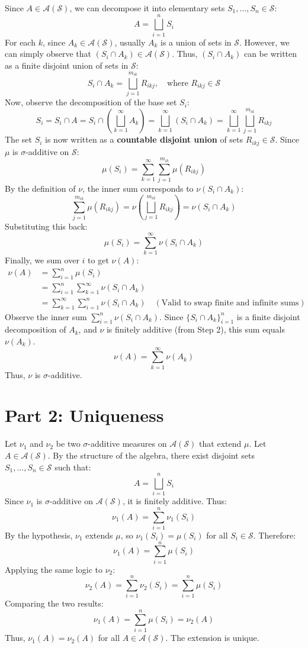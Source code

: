\documentclass[12pt, a4paper]{article}
\theoremstyle{definition}
\newcommand{\Sem}{\mathcal{S}} %
\newcommand{\Alg}{\mathcal{A}(\mathcal{S})} %
\newcommand{\DisjointUnion}{\bigsqcup}
\begin{document}
Since $A \in \Alg$, we can decompose it into elementary sets $S_1, \dots, S_n \in \Sem$:
\[
A = \DisjointUnion_{i=1}^n S_i
\]
For each $k$, since $A_k \in \Alg$, usually $A_k$ is a union of sets in $\Sem$. However, we can simply observe that $(S_i \cap A_k) \in \Alg$. Thus, $(S_i \cap A_k)$ can be written as a finite disjoint union of sets in $\Sem$:
\[
S_i \cap A_k = \DisjointUnion_{j=1}^{m_{ik}} R_{ikj}, \quad \text{where } R_{ikj} \in \Sem
\]
Now, observe the decomposition of the base set $S_i$:
\[
S_i = S_i \cap A = S_i \cap \left( \DisjointUnion_{k=1}^\infty A_k \right) = \DisjointUnion_{k=1}^\infty (S_i \cap A_k) = \DisjointUnion_{k=1}^\infty \DisjointUnion_{j=1}^{m_{ik}} R_{ikj}
\]
The set $S_i$ is now written as a \textbf{countable disjoint union} of sets $R_{ikj} \in \Sem$. Since $\mu$ is $\sigma$-additive on $\Sem$:
\[
\mu(S_i) = \sum_{k=1}^\infty \sum_{j=1}^{m_{ik}} \mu(R_{ikj})
\]
By the definition of $\nu$, the inner sum corresponds to $\nu(S_i \cap A_k)$:
\[
\sum_{j=1}^{m_{ik}} \mu(R_{ikj}) = \nu\left( \DisjointUnion_{j=1}^{m_{ik}} R_{ikj} \right) = \nu(S_i \cap A_k)
\]
Substituting this back:
\[
\mu(S_i) = \sum_{k=1}^\infty \nu(S_i \cap A_k)
\]
Finally, we sum over $i$ to get $\nu(A)$:
\begin{align*}
    \nu(A) &= \sum_{i=1}^n \mu(S_i) \\
           &= \sum_{i=1}^n \sum_{k=1}^\infty \nu(S_i \cap A_k) \\
           &= \sum_{k=1}^\infty \sum_{i=1}^n \nu(S_i \cap A_k) \quad (\text{Valid to swap finite and infinite sums})
\end{align*}
Observe the inner sum $\sum_{i=1}^n \nu(S_i \cap A_k)$. Since $\{S_i \cap A_k\}_{i=1}^n$ is a finite disjoint decomposition of $A_k$, and $\nu$ is finitely additive (from Step 2), this sum equals $\nu(A_k)$.
\[
\nu(A) = \sum_{k=1}^\infty \nu(A_k)
\]
Thus, $\nu$ is $\sigma$-additive.

\section{Part 2: Uniqueness}

Let $\nu_1$ and $\nu_2$ be two $\sigma$-additive measures on $\Alg$ that extend $\mu$.
Let $A \in \Alg$. By the structure of the algebra, there exist disjoint sets $S_1, \dots, S_n \in \Sem$ such that:
\[
A = \DisjointUnion_{i=1}^n S_i
\]
Since $\nu_1$ is $\sigma$-additive on $\Alg$, it is finitely additive. Thus:
\[
\nu_1(A) = \sum_{i=1}^n \nu_1(S_i)
\]
By the hypothesis, $\nu_1$ extends $\mu$, so $\nu_1(S_i) = \mu(S_i)$ for all $S_i \in \Sem$. Therefore:
\[
\nu_1(A) = \sum_{i=1}^n \mu(S_i)
\]
Applying the same logic to $\nu_2$:
\[
\nu_2(A) = \sum_{i=1}^n \nu_2(S_i) = \sum_{i=1}^n \mu(S_i)
\]
Comparing the two results:
\[
\nu_1(A) = \sum_{i=1}^n \mu(S_i) = \nu_2(A)
\]
Thus, $\nu_1(A) = \nu_2(A)$ for all $A \in \Alg$. The extension is unique.
\end{document}
